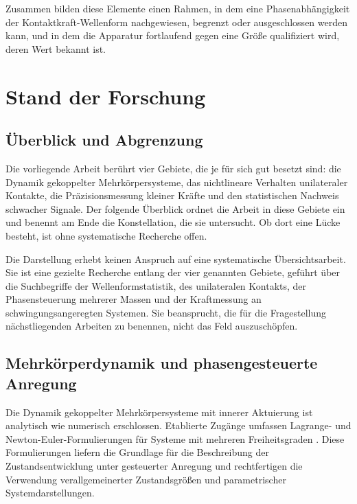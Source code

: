 \documentclass[12pt,a4paper]{report}
\begin{document}
Zusammen bilden diese Elemente einen Rahmen, in dem eine
Phasenabhängigkeit der Kontaktkraft-Wellenform nachgewiesen, begrenzt
oder ausgeschlossen werden kann, und in dem die Apparatur fortlaufend
gegen eine Größe qualifiziert wird, deren Wert bekannt ist.


\chapter{Stand der Forschung}
\label{chap:stand}

\section{Überblick und Abgrenzung}

Die vorliegende Arbeit berührt vier Gebiete, die je für sich gut besetzt
sind: die Dynamik gekoppelter Mehrkörpersysteme, das nichtlineare
Verhalten unilateraler Kontakte, die Präzisionsmessung kleiner Kräfte und
den statistischen Nachweis schwacher Signale. Der folgende Überblick
ordnet die Arbeit in diese Gebiete ein und benennt am Ende die
Konstellation, die sie untersucht. Ob dort eine Lücke besteht, ist ohne
systematische Recherche offen.

Die Darstellung erhebt keinen Anspruch auf eine systematische
Übersichtsarbeit. Sie ist eine gezielte Recherche entlang der vier
genannten Gebiete, geführt über die Suchbegriffe der
Wellenformstatistik, des unilateralen Kontakts, der Phasensteuerung
mehrerer Massen und der Kraftmessung an schwingungsangeregten Systemen.
Sie beansprucht, die für die Fragestellung nächstliegenden Arbeiten zu
benennen, nicht das Feld auszuschöpfen.

\section{Mehrkörperdynamik und phasengesteuerte Anregung}

Die Dynamik gekoppelter Mehrkörpersysteme mit innerer Aktuierung ist
analytisch wie numerisch erschlossen. Etablierte Zugänge umfassen
Lagrange- und Newton-Euler-Formulierungen für Systeme mit mehreren
Freiheitsgraden \cite{lanczos1986, featherstone2008, shabana2010}. Diese
Formulierungen liefern die Grundlage für die Beschreibung der
Zustandsentwicklung unter gesteuerter Anregung und rechtfertigen die
Verwendung verallgemeinerter Zustandsgrößen und parametrischer
Systemdarstellungen.
\end{document}
